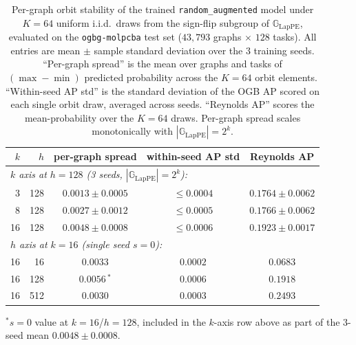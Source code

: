 \documentclass{article}
\theoremstyle{definition}
\theoremstyle{plain}
\newcommand{\G}{\mathbb{G}}
\begin{document}
\begin{table}[h]
\centering
\caption{Per-graph orbit stability of the trained
\texttt{random\_augmented} model under $K\!=\!64$ uniform i.i.d.\
draws from the sign-flip subgroup of $\G_{\mathrm{LapPE}}$, evaluated
on the \texttt{ogbg-molpcba} test set ($43{,}793$ graphs $\times$
$128$ tasks). All entries are mean $\pm$ sample standard deviation
over the $3$ training seeds. ``Per-graph spread'' is the mean over
graphs and tasks of $(\max\!-\!\min)$ predicted probability across
the $K\!=\!64$ orbit elements. ``Within-seed AP std'' is the standard
deviation of the OGB AP scored on each single orbit draw, averaged
across seeds. ``Reynolds AP'' scores the mean-probability over the
$K\!=\!64$ draws. Per-graph spread scales monotonically with
$|\G_{\mathrm{LapPE}}|\!=\!2^{k}$.}
\label{tab:lpe_molpcba_orbit}
\begin{tabular}{rrccc}
\toprule
$k$ & $h$ & per-graph spread & within-seed AP std & Reynolds AP \\
\midrule
\multicolumn{5}{l}{\emph{$k$ axis at $h\!=\!128$ (3 seeds, $|\G_{\mathrm{LapPE}}|\!=\!2^{k}$):}} \\
 3  & 128 & $0.0013 \pm 0.0005$ & $\le 0.0004$ & $0.1764 \pm 0.0062$ \\
 8  & 128 & $0.0027 \pm 0.0012$ & $\le 0.0005$ & $0.1766 \pm 0.0062$ \\
16  & 128 & $0.0048 \pm 0.0008$ & $\le 0.0006$ & $0.1923 \pm 0.0017$ \\
\midrule
\multicolumn{5}{l}{\emph{$h$ axis at $k\!=\!16$ (single seed $s\!=\!0$):}} \\
16  &  16 & $0.0033$            & $0.0002$    & $0.0683$ \\
16  & 128 & $0.0056$\,$^{*}$    & $0.0006$    & $0.1918$ \\
16  & 512 & $0.0030$            & $0.0003$    & $0.2493$ \\
\bottomrule
\end{tabular}
\smallskip
\par\noindent\footnotesize $^{*}$$s\!=\!0$ value at $k\!=\!16$/$h\!=\!128$, included in the $k$-axis row above as part of the 3-seed mean $0.0048\!\pm\!0.0008$.\normalsize
\end{table}
\end{document}
